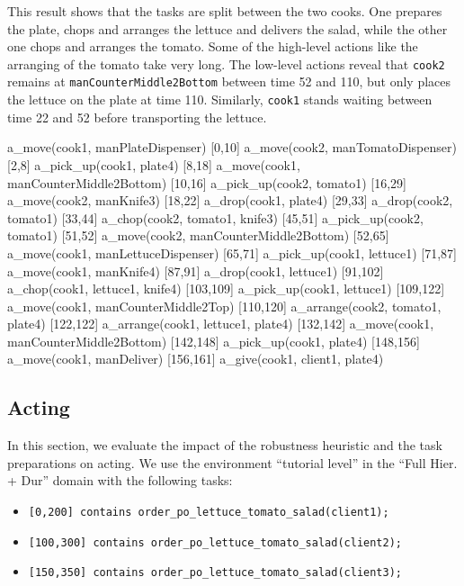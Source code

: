 This result shows that the tasks are split between the two cooks.
One prepares the plate, chops and arranges the lettuce and delivers the salad, while the other one chops and arranges the tomato.
Some of the high-level actions like the arranging of the tomato take very long.
The low-level actions reveal that \verb|cook2| remains at \verb|manCounterMiddle2Bottom| between time 52 and 110, but only places the lettuce on the plate at time 110.
Similarly, \verb|cook1| stands waiting between time 22 and 52 before transporting the lettuce.


\begin{anmlcode}
[0,2]     a_move(cook1, manPlateDispenser)
[0,10]    a_move(cook2, manTomatoDispenser)
[2,8]     a_pick_up(cook1, plate4)
[8,18]    a_move(cook1, manCounterMiddle2Bottom)
[10,16]   a_pick_up(cook2, tomato1)
[16,29]   a_move(cook2, manKnife3)
[18,22]   a_drop(cook1, plate4)
[29,33]   a_drop(cook2, tomato1)
[33,44]   a_chop(cook2, tomato1, knife3)
[45,51]   a_pick_up(cook2, tomato1)
[51,52]   a_move(cook2, manCounterMiddle2Bottom)
[52,65]   a_move(cook1, manLettuceDispenser)
[65,71]   a_pick_up(cook1, lettuce1)
[71,87]   a_move(cook1, manKnife4)
[87,91]   a_drop(cook1, lettuce1)
[91,102]  a_chop(cook1, lettuce1, knife4)
[103,109] a_pick_up(cook1, lettuce1)
[109,122] a_move(cook1, manCounterMiddle2Top)
[110,120] a_arrange(cook2, tomato1, plate4)
[122,122] a_arrange(cook1, lettuce1, plate4)
[132,142] a_move(cook1, manCounterMiddle2Bottom)
[142,148] a_pick_up(cook1, plate4)
[148,156] a_move(cook1, manDeliver)
[156,161] a_give(cook1, client1, plate4)
\end{anmlcode}

\subsection{Acting}
\label{sec:evaluation-acting}

In this section, we evaluate the impact of the robustness heuristic and the task preparations on acting.
We use the environment ``tutorial level'' in the ``Full Hier. + Dur'' domain with the following tasks:
\begin{itemize}
  \item \verb|[0,200] contains order_po_lettuce_tomato_salad(client1);|
  \item \verb|[100,300] contains order_po_lettuce_tomato_salad(client2);|
  \item \verb|[150,350] contains order_po_lettuce_tomato_salad(client3);|
\end{itemize}

